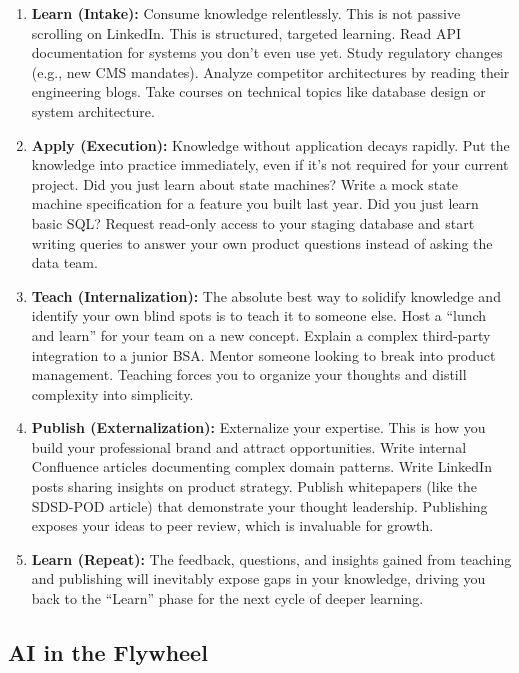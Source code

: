 \begin{enumerate}
\def\labelenumi{\arabic{enumi}.}
\tightlist
\item
  \textbf{Learn (Intake):} Consume knowledge relentlessly. This is not
  passive scrolling on LinkedIn. This is structured, targeted learning.
  Read API documentation for systems you don't even use yet. Study
  regulatory changes (e.g., new CMS mandates). Analyze competitor
  architectures by reading their engineering blogs. Take courses on
  technical topics like database design or system architecture.
\item
  \textbf{Apply (Execution):} Knowledge without application decays
  rapidly. Put the knowledge into practice immediately, even if it's not
  required for your current project. Did you just learn about state
  machines? Write a mock state machine specification for a feature you
  built last year. Did you just learn basic SQL? Request read-only
  access to your staging database and start writing queries to answer
  your own product questions instead of asking the data team.
\item
  \textbf{Teach (Internalization):} The absolute best way to solidify
  knowledge and identify your own blind spots is to teach it to someone
  else. Host a ``lunch and learn'' for your team on a new concept.
  Explain a complex third-party integration to a junior BSA. Mentor
  someone looking to break into product management. Teaching forces you
  to organize your thoughts and distill complexity into simplicity.
\item
  \textbf{Publish (Externalization):} Externalize your expertise. This
  is how you build your professional brand and attract opportunities.
  Write internal Confluence articles documenting complex domain
  patterns. Write LinkedIn posts sharing insights on product strategy.
  Publish whitepapers (like the SDSD-POD article) that demonstrate your
  thought leadership. Publishing exposes your ideas to peer review,
  which is invaluable for growth.
\item
  \textbf{Learn (Repeat):} The feedback, questions, and insights gained
  from teaching and publishing will inevitably expose gaps in your
  knowledge, driving you back to the ``Learn'' phase for the next cycle
  of deeper learning.
\end{enumerate}

\subsection{AI in the Flywheel}\label{ai-in-the-flywheel}

